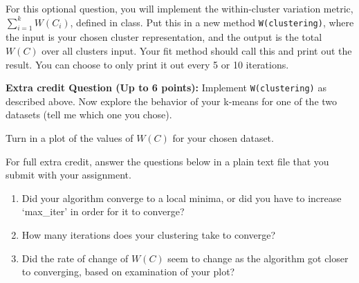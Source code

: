 \documentclass[11pt]{article}
\begin{document}
For this optional question, you will implement the within-cluster variation metric, $\sum_{i=1}^k W(C_i)$, defined 
in class. Put this in a new method \texttt{W(clustering)}, where the input is your chosen cluster representation, and the output is the total $W(C)$ over all clusters input.
Your fit method should call this and print out the result. You can choose to only print
it out every 5 or 10 iterations.

\textbf{Extra credit Question (Up to 6 points):} 
Implement  \texttt{W(clustering)} as described above. Now explore the behavior of your k-means for one of the two datasets (tell me which one you chose).

Turn in a plot of the values of 
$W(C)$ for your chosen dataset. 

For full extra credit,
answer the questions below in a plain text file that you submit with your assignment.
\begin{enumerate}
\item Did your algorithm converge to a local minima, or did you have to increase `max\_iter' in
order for it to converge?
\item  How many iterations does your clustering take to converge?
\item Did the rate of change of $W(C)$ seem to change as the algorithm got closer to converging, based on examination of your plot?
\end{enumerate}
\end{document}
